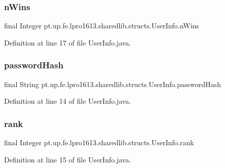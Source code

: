 \subsubsection{\texorpdfstring{n\+Wins}{nWins}}
{\footnotesize\ttfamily final Integer pt.\+up.\+fe.\+lpro1613.\+sharedlib.\+structs.\+User\+Info.\+n\+Wins}



Definition at line 17 of file User\+Info.\+java.

\hypertarget{classpt_1_1up_1_1fe_1_1lpro1613_1_1sharedlib_1_1structs_1_1_user_info_a462459c12a260d69419a03f4a9f21bb6}{}\label{classpt_1_1up_1_1fe_1_1lpro1613_1_1sharedlib_1_1structs_1_1_user_info_a462459c12a260d69419a03f4a9f21bb6} 
\subsubsection{\texorpdfstring{password\+Hash}{passwordHash}}
{\footnotesize\ttfamily final String pt.\+up.\+fe.\+lpro1613.\+sharedlib.\+structs.\+User\+Info.\+password\+Hash}



Definition at line 14 of file User\+Info.\+java.

\hypertarget{classpt_1_1up_1_1fe_1_1lpro1613_1_1sharedlib_1_1structs_1_1_user_info_afc6d51cea03d0ee5a94160fadbef62c4}{}\label{classpt_1_1up_1_1fe_1_1lpro1613_1_1sharedlib_1_1structs_1_1_user_info_afc6d51cea03d0ee5a94160fadbef62c4} 
\subsubsection{\texorpdfstring{rank}{rank}}
{\footnotesize\ttfamily final Integer pt.\+up.\+fe.\+lpro1613.\+sharedlib.\+structs.\+User\+Info.\+rank}



Definition at line 15 of file User\+Info.\+java.

